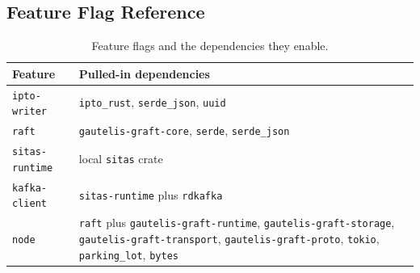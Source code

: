 \subsection{Feature Flag Reference}

\begin{table}[htbp]
\centering
\begin{tabular}{ll}
\hline
Feature & Pulled-in dependencies \\
\hline
\texttt{ipto-writer} & \texttt{ipto\_rust}, \texttt{serde\_json}, \texttt{uuid} \\
\texttt{raft} & \texttt{gautelis-graft-core}, \texttt{serde}, \texttt{serde\_json} \\
\texttt{sitas-runtime} & local \texttt{sitas} crate \\
\texttt{kafka-client} & \texttt{sitas-runtime} plus \texttt{rdkafka} \\
\texttt{node} & \texttt{raft} plus \texttt{gautelis-graft-runtime}, \texttt{gautelis-graft-storage}, \texttt{gautelis-graft-transport}, \texttt{gautelis-graft-proto}, \texttt{tokio}, \texttt{parking\_lot}, \texttt{bytes} \\
\hline
\end{tabular}
\caption{Feature flags and the dependencies they enable.}
\end{table}

\endinput
